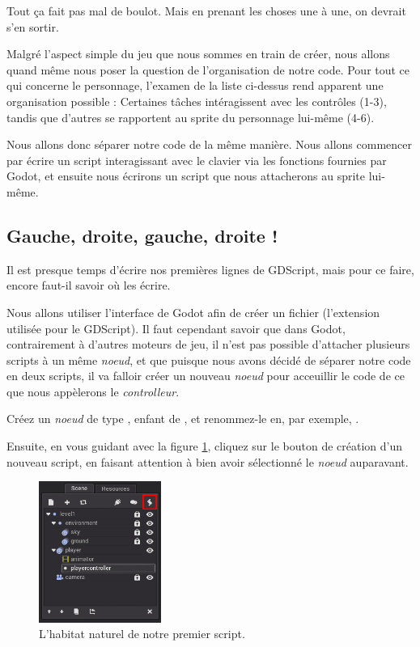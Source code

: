 Tout ça fait pas mal de boulot. Mais en prenant les choses une à une, on devrait s'en sortir.

Malgré l'aspect simple du jeu que nous sommes en train de créer, nous allons quand même nous poser la question de l'organisation de notre code. Pour tout ce qui concerne le personnage, l'examen de la liste ci-dessus rend apparent une organisation possible : Certaines tâches intéragissent avec les contrôles (1-3), tandis que d'autres se rapportent au sprite du personnage lui-même (4-6).

Nous allons donc séparer notre code de la même manière. Nous allons commencer par écrire un script interagissant avec le clavier via les fonctions fournies par Godot, et ensuite nous écrirons un script que nous attacherons au sprite lui-même.

\subsection{Gauche, droite, gauche, droite !}

Il est presque temps d'écrire nos premières lignes de GDScript, mais pour ce faire, encore faut-il savoir où les écrire.

Nous allons utiliser l'interface de Godot afin de créer un fichier  (l'extension utilisée pour le GDScript). Il faut cependant savoir que dans Godot, contrairement à d'autres moteurs de jeu, il n'est pas possible d'attacher plusieurs scripts à un même \emph{noeud}, et que puisque nous avons décidé de séparer notre code en deux scripts, il va falloir créer un nouveau \emph{noeud} pour acceuillir le code de ce que nous appèlerons le \emph{controlleur}.

Créez un \emph{noeud} de type , enfant de , et renommez-le en, par exemple, .

Ensuite, en vous guidant avec la figure \ref{lvl1-playercontroller}, cliquez sur le bouton de création d'un nouveau script, en faisant attention à bien avoir sélectionné le \emph{noeud}  auparavant.

\begin{figure}
  \begin{center}
    \includegraphics[width=4cm]{img/lvl1-playercontroller.png}
  \end{center}
  \caption{\label{lvl1-playercontroller} L'habitat naturel de notre premier script.}
\end{figure}

